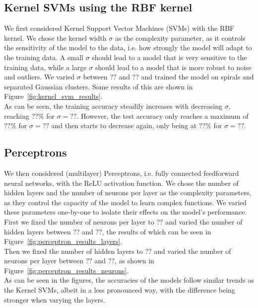 \documentclass[11pt]{article}
\begin{document}
\subsection{Kernel SVMs using the RBF kernel}
We first considered Kernel Support Vector Machines (SVMs) with the RBF kernel. We chose the kernel width $\sigma$ as the complexity parameter, as it controls the sensitivity of the model to the data, i.e. how strongly the model will adapt to the training data. A small $\sigma$ should lead to a model that is very sensitive to the training data, while a large $\sigma$ should lead to a model that is more robust to noise and outliers. We varied $\sigma$ between $??$ and $??$ and trained the model on spirals and separated Gaussian clusters. Some results of this are shown in Figure~\ref{fig:kernel_svm_results}. \\
As can be seen, the training accuracy steadily increases with decreasing $\sigma$, reaching $??\%$ for $\sigma=??$. However, the test accuracy only reaches a maximum of $??\%$ for $\sigma=??$ and then starts to decrease again, only being at $??\%$ for $\sigma=??$.

\subsection{Perceptrons}
We then considered (multilayer) Perceptrons, i.e. fully connected feedforward neural networks, with the ReLU activation function. We chose the number of hidden layers and the number of neurons per layer as the complexity parameters, as they control the capacity of the model to learn complex functions. We varied these parameters one-by-one to isolate their effects on the model's performance. First we fixed the number of neurons per layer to $??$ and varied the number of hidden layers between $??$ and $??$, the results of which can be seen in Figure~\ref{fig:perceptron_results_layers}. \\
Then we fixed the number of hidden layers to $??$ and varied the number of neurons per layer between $??$ and $??$, as shown in Figure~\ref{fig:perceptron_results_neurons}. \\
As can be seen in the figures, the accuracies of the models follow similar trends as the Kernel SVMs, albeit in a less pronounced way, with the difference being stronger when varying the layers.
\end{document}
